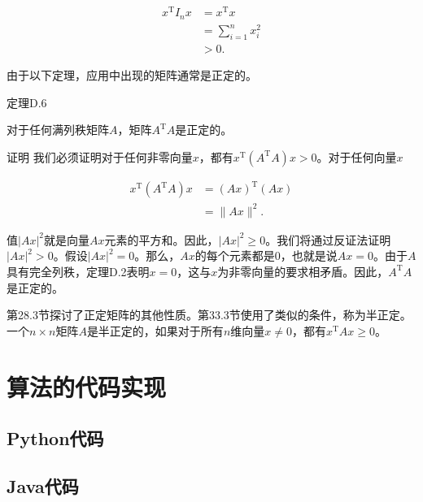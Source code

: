 \documentclass[lang=cn,newtx,10pt,scheme=chinese]{elegantbook}
\begin{document}
$$
\begin{aligned}
x^{\mathrm{T}} I_n x & =x^{\mathrm{T}} x \\
& =\sum_{i=1}^n x_i^2 \\
& >0 .
\end{aligned}
$$

由于以下定理，应用中出现的矩阵通常是正定的。

定理D.6

对于任何满列秩矩阵$A$，矩阵$A^{\mathrm{T}} A$是正定的。

证明 我们必须证明对于任何非零向量$x$，都有$x^{\mathrm{T}}(A^{\mathrm{T}} A) x>0$。对于任何向量$x$

$$
\begin{aligned}
x^{\mathrm{T}}(A^{\mathrm{T}} A) x & =(A x)^{\mathrm{T}}(A x) \\
& =\|A x\|^2 .
\end{aligned}
$$

值$|Ax|^2$就是向量$Ax$元素的平方和。因此，$|Ax|^2 \geq 0$。我们将通过反证法证明$|Ax|^2>0$。假设$|Ax|^2=0$。那么，$Ax$的每个元素都是0，也就是说$Ax=0$。由于$A$具有完全列秩，定理D.2表明$x=0$，这与$x$为非零向量的要求相矛盾。因此，$A^{\mathrm{T}} A$是正定的。

第28.3节探讨了正定矩阵的其他性质。第33.3节使用了类似的条件，称为半正定。一个$n \times n$矩阵$A$是半正定的，如果对于所有$n$维向量$x \neq 0$，都有$x^{\mathrm{T}} A x \geq 0$。

\part{算法的代码实现}

\chapter{Python代码}

\chapter{Java代码}
\end{document}
